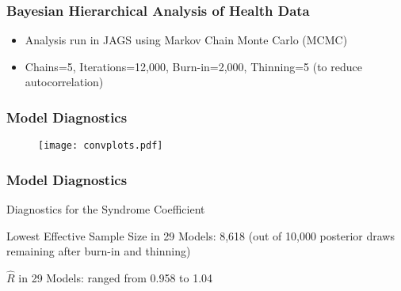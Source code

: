 \documentclass{beamer}
\begin{document}
\begin{frame}
\frametitle{Bayesian Hierarchical Analysis of Health Data}
\begin{itemize}
\item Analysis run in JAGS using Markov Chain Monte Carlo (MCMC)
\item Chains=5, Iterations=12,000, Burn-in=2,000, Thinning=5 (to reduce autocorrelation)
\end{itemize}
\end{frame}

\begin{frame}
\frametitle{Model Diagnostics}
\begin{figure}
\texttt{[image: convplots.pdf]}
\end{figure}
\end{frame}

\begin{frame}
\frametitle{Model Diagnostics}
Diagnostics for the Syndrome Coefficient
\itemize
\item Lowest Effective Sample Size in 29 Models: 8,618 (out of 10,000 posterior draws remaining after burn-in and thinning)
\item $\hat{R}$ in 29 Models: ranged from 0.958 to 1.04
\end{frame}
\end{document}
